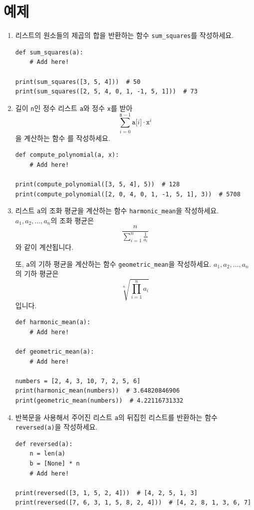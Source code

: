 \documentclass[../main.tex]{subfiles}
\begin{document}
\section{예제}
\begin{enumerate}
\item 리스트의 원소들의 제곱의 합을 반환하는 함수 \verb/sum_squares/를 작성하세요.
\begin{verbatim}
def sum_squares(a):
    # Add here!

print(sum_squares([3, 5, 4]))  # 50
print(sum_squares([2, 5, 4, 0, 1, -1, 5, 1]))  # 73
\end{verbatim}

\item 길이 \verb/n/인 정수 리스트 \verb/a/와 정수 \verb/x/를 받아
\[
\sum_{i = 0}^{\texttt{n} - 1} \texttt{a[}i\texttt{]} \cdot \texttt{x}^i
\]
을 계산하는 함수 를 작성하세요.
\begin{verbatim}
def compute_polynomial(a, x):
    # Add here!

print(compute_polynomial([3, 5, 4], 5))  # 128
print(compute_polynomial([2, 0, 4, 0, 1, -1, 5, 1], 3))  # 5708
\end{verbatim}

\item 리스트 \verb/a/의 조화 평균을 계산하는 함수 \verb/harmonic_mean/을 작성하세요.
  $a_1, a_2, \dots, a_n$의 조화 평균은
\[
\frac{n}{\sum_{i = 1}^{n} \frac{1}{a_i}}
\]
와 같이 계산됩니다.

또, \verb/a/의 기하 평균을 계산하는 함수 \verb/geometric_mean/을 작성하세요.
$a_1, a_2, \dots, a_n$의 기하 평균은
\[
\sqrt[n]{\prod_{i = 1}^{n} a_i}
\]
입니다.

\begin{verbatim}
def harmonic_mean(a):
    # Add here!

def geometric_mean(a):
    # Add here!

numbers = [2, 4, 3, 10, 7, 2, 5, 6]
print(harmonic_mean(numbers))  # 3.64820846906
print(geometric_mean(numbers))  # 4.22116731332
\end{verbatim}

\item 반복문을 사용해서 주어진 리스트 \verb/a/의 뒤집힌 리스트를 반환하는 함수 \verb/reversed(a)/을 작성하세요.
\begin{verbatim}
def reversed(a):
    n = len(a)
    b = [None] * n
    # Add here!

print(reversed([3, 1, 5, 2, 4]))  # [4, 2, 5, 1, 3]
print(reversed([7, 6, 3, 1, 5, 8, 2, 4]))  # [4, 2, 8, 1, 3, 6, 7]
\end{verbatim}


\end{enumerate}
\end{document}
